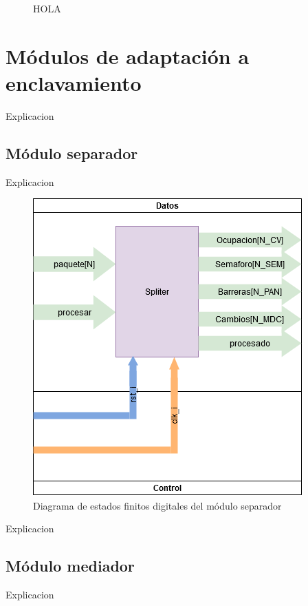 	\begin{figure}[h]
	\centering
		\caption{HOLA}
		\label{fig:hola}
	\end{figure}
	
\section{Módulos de adaptación a enclavamiento}

	Explicacion 
	 
	\subsection{Módulo separador}
		Explicacion 
		
		\begin{figure}[h]
		\centering
			\includegraphics[scale=.3]{./Figures/FSMD-Separador}
			\caption{Diagrama de estados finitos digitales del módulo separador}
			\label{fig:FSMD_Separador}
		\end{figure}
		
		Explicacion 
		
	\subsection{Módulo mediador}
	
		Explicacion 
		
